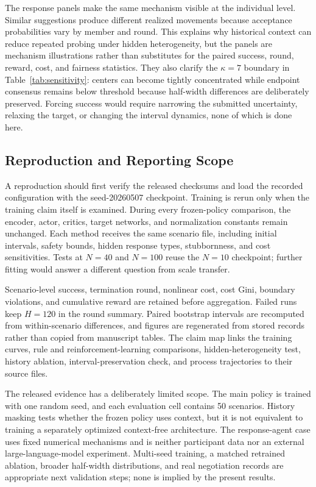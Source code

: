 \documentclass[journal]{IEEEtran}
\begin{document}
The response panels make the same mechanism visible at the individual level. Similar suggestions produce different realized movements because acceptance probabilities vary by member and round. This explains why historical context can reduce repeated probing under hidden heterogeneity, but the panels are mechanism illustrations rather than substitutes for the paired success, round, reward, cost, and fairness statistics. They also clarify the $\kappa=7$ boundary in Table~\ref{tab:sensitivity}: centers can become tightly concentrated while endpoint consensus remains below threshold because half-width differences are deliberately preserved. Forcing success would require narrowing the submitted uncertainty, relaxing the target, or changing the interval dynamics, none of which is done here.

\subsection{Reproduction and Reporting Scope}

A reproduction should first verify the released checksums and load the recorded configuration with the seed-20260507 checkpoint. Training is rerun only when the training claim itself is examined. During every frozen-policy comparison, the encoder, actor, critics, target networks, and normalization constants remain unchanged. Each method receives the same scenario file, including initial intervals, safety bounds, hidden response types, stubbornness, and cost sensitivities. Tests at $N=40$ and $N=100$ reuse the $N=10$ checkpoint; further fitting would answer a different question from scale transfer.

Scenario-level success, termination round, nonlinear cost, cost Gini, boundary violations, and cumulative reward are retained before aggregation. Failed runs keep $H=120$ in the round summary. Paired bootstrap intervals are recomputed from within-scenario differences, and figures are regenerated from stored records rather than copied from manuscript tables. The claim map links the training curves, rule and reinforcement-learning comparisons, hidden-heterogeneity test, history ablation, interval-preservation check, and process trajectories to their source files.

The released evidence has a deliberately limited scope. The main policy is trained with one random seed, and each evaluation cell contains 50 scenarios. History masking tests whether the frozen policy uses context, but it is not equivalent to training a separately optimized context-free architecture. The response-agent case uses fixed numerical mechanisms and is neither participant data nor an external large-language-model experiment. Multi-seed training, a matched retrained ablation, broader half-width distributions, and real negotiation records are appropriate next validation steps; none is implied by the present results.
\end{document}
